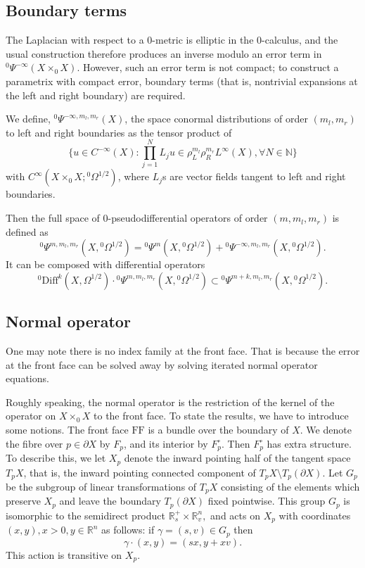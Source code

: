\documentclass[10pt, a4paper, twoside]{amsart}
\numberwithin{equation}{section}
\theoremstyle{remark}
\begin{document}
\subsection{Boundary terms}

The Laplacian with respect to a $0$-metric is elliptic in the $0$-calculus, and the usual construction therefore produces an inverse modulo an error term in ${}^0 \Psi^{-\infty}(X \times_0 X)$. 
However, such an error term is not compact; to construct a parametrix with compact error, boundary terms (that is, nontrivial expansions at the left and right boundary) are required. 

We define, ${}^0\Psi^{- \infty, m_l, m_r}(X)$, the space conormal distributions of order $(m_l, m_r)$ to left and right boundaries as the tensor product of $$\bigg\{u \in C^{-\infty}(X) : \prod_{j = 1}^N L_j u \in \rho_L^{m_l} \rho_R^{m_r} L^\infty(X), \forall N \in \mathbb{N} \bigg\}$$ with $C^\infty(X \times_0 X; {}^0\Omega^{1/2})$, where $L_j$s are vector fields tangent to left and right boundaries.

Then the full space of $0$-pseudodifferential operators of order $(m, m_l, m_r)$ is defined as $${}^0 \Psi^{m, m_l, m_r}(X, {}^0\Omega^{1/2}) = {}^0 \Psi^m(X, {}^0\Omega^{1/2}) + {}^0 \Psi^{- \infty, m_l, m_r}(X, {}^0\Omega^{1/2}).$$ It can be composed with differential operators $${}^0\text{Diff}^k(X, \Omega^{1/2}) \cdot {}^0\Psi^{m, m_l, m_r}(X, {}^0\Omega^{1/2}) \subset  {}^0\Psi^{m + k, m_l, m_r}(X, {}^0\Omega^{1/2}).$$

\subsection{Normal operator}

One may note there is no index family at the front face. That is because the error at the front face can be solved away by solving iterated normal operator equations.

Roughly speaking, the normal operator is the restriction of the kernel of  the operator on $X \times_0 X$ to the front face. To state the results, we have to introduce some notions. The front face ${\mathrm{FF}}$ is a bundle over the boundary of $X$.  We denote the fibre over $p \in \partial X$ by $F_p$, and its interior by $F^\circ_p$. 
Then $F_p^\circ$ has extra structure. 
To describe this, we let $X_p$ denote the inward pointing half of the tangent space $T_pX$, that is, the inward pointing connected component of $T_pX \setminus T_p(\partial X)$. 
Let $G_p$ be the subgroup of linear transformations of $T_pX$ consisting of the elements which preserve $X_p$ and leave the boundary $T_p(\partial X)$ fixed pointwise. This group $G_p$ is isomorphic to the semidirect product $\mathbb{R}^+_s \times \mathbb{R}^n_v,$ and acts on $X_p$ with coordinates $(x, y), x > 0, y \in {\mathbb{R}}^n$ as follows: if $\gamma = (s, v) \in G_p$ then 
$$
\gamma \cdot (x, y) = (sx, y + xv).
$$ 
This action is transitive on $X_p$.
\end{document}
